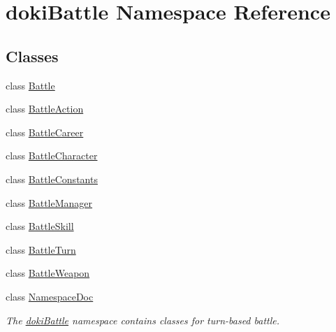 \hypertarget{namespacedoki_battle}{}\section{doki\+Battle Namespace Reference}
\label{namespacedoki_battle}
\subsection*{Classes}
\begin{DoxyCompactItemize}
\item 
class \hyperlink{classdoki_battle_1_1_battle}{Battle}
\item 
class \hyperlink{classdoki_battle_1_1_battle_action}{Battle\+Action}
\item 
class \hyperlink{classdoki_battle_1_1_battle_career}{Battle\+Career}
\item 
class \hyperlink{classdoki_battle_1_1_battle_character}{Battle\+Character}
\item 
class \hyperlink{classdoki_battle_1_1_battle_constants}{Battle\+Constants}
\item 
class \hyperlink{classdoki_battle_1_1_battle_manager}{Battle\+Manager}
\item 
class \hyperlink{classdoki_battle_1_1_battle_skill}{Battle\+Skill}
\item 
class \hyperlink{classdoki_battle_1_1_battle_turn}{Battle\+Turn}
\item 
class \hyperlink{classdoki_battle_1_1_battle_weapon}{Battle\+Weapon}
\item 
class \hyperlink{classdoki_battle_1_1_namespace_doc}{Namespace\+Doc}
\begin{DoxyCompactList}\small\item\em The \hyperlink{namespacedoki_battle}{doki\+Battle} namespace contains classes for turn-\/based battle. \end{DoxyCompactList}\end{DoxyCompactItemize}
